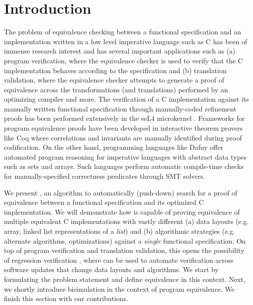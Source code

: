 \section{Introduction}
\label{sec:syn-intro}

The problem of equivalence checking between a functional specification and an
implementation written in a low level imperative language such as C
has been of immense research interest
and has several important applications such as (a) program verification, where
the equivalence checker is used to verify that the C implementation
behaves according to the specification and (b) translation validation, where
the equivalence checker attempts to generate a proof of equivalence across
the transformations (and translations) performed by an optimizing compiler
and more. The verification of a C implementation against its manually written
functional specification through manually-coded refinement proofs has been
performed extensively in the seL4 microkernel \cite{seL4}.
Frameworks for program equivalence proofs have been developed in interactive
theorem provers like Coq \cite{programEquivalenceInCoq} where correlations and invariants
are manually identified during proof codification.
On the other hand, programming languages like Dafny \cite{dafny} offer automated program
reasoning for imperative languages with abstract data types such as sets and arrays.
Such languages perform automatic compile-time checks for manually-specified correctness predicates through
SMT solvers.

We present \toolName{}, an algorithm to automatically (push-down) search
for a proof of equivalence between a functional specification and its
optimized C implementation. We will demonstrate how \toolName{} is capable of
proving equivalence of multiple equivalent C implementations with vastly
different (a) data layouts (e.g. array, linked list representations of a {\em list})
and (b) algorithmic strategies (e.g. alternate algorithms, optimizations) against
a {\em single} functional specification. On top of program verification and translation
validation, this opens the possibility of regression verification \cite{strichman_regressverify,felsing14},
where \toolName{} can be used to automate verification across software updates that change data layouts
and algorithms. We start by formulating the problem statement and define equivalence in this context.
Next, we shortly introduce bisimulation in the context of program equivalence.
We finish this section with our contributions.

